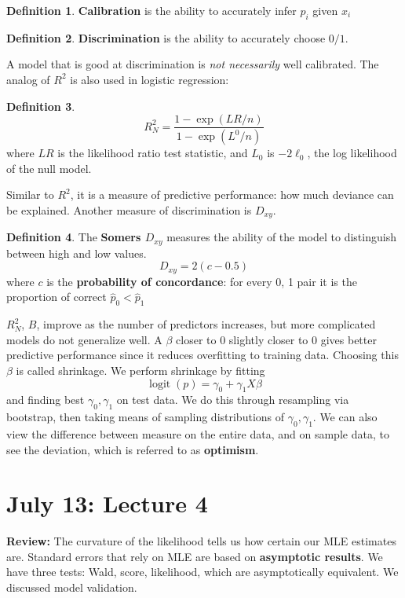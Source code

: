 \documentclass[12pt, a4paper]{article}
\theoremstyle{definition}
\newtheorem{definition}{Definition}
\newcommand{\f}{\frac}
\newcommand{\logit}{\operatorname{logit}}
\begin{document}
	\begin{definition}
		{\bf Calibration} is the ability to accurately infer $p_i$ given $x_i$
	\end{definition}

	\begin{definition}
		{\bf Discrimination} is the ability to accurately choose $0/1$.
	\end{definition}

	A model that is good at discrimination is \textit{not necessarily} well calibrated. The analog of $R^2$ is also used in logistic regression:
	
	\begin{definition}
		$$
			R_N^2 = \f{1 - \exp(LR/n)}{1 - \exp(L^0/n)}
		$$
		where $LR$ is the likelihood ratio test statistic, and $L_0$ is $-2\ell_0$, the log likelihood of the null model.
	\end{definition}
	Similar to $R^2$, it is a measure of predictive performance: how much deviance can be explained. Another measure of discrimination is $D_{xy}$.
	\begin{definition}
		The {\bf Somers $D_{xy}$} measures the ability of the model to distinguish between high and low values. 
		$$D_{xy} = 2(c-0.5)$$
		 where $c$ is the {\bf probability of concordance}: for every 0, 1 pair it is the proportion of correct $\hat p_0 < \hat p_1$
	\end{definition}
	
	$R_N^2$, $B$, improve as the number of predictors increases, but more complicated models do not generalize well. A $\beta$ closer to $0$ slightly closer to $0$ gives better predictive performance since it reduces overfitting to training data. Choosing this $\beta$ is called shrinkage. We perform shrinkage by fitting 
	$$
		\logit(p) = \gamma_0 + \gamma_1 X\beta
	$$
	and finding best $\gamma_0, \gamma_1$ on test data. We do this through resampling via bootstrap, then taking means of sampling distributions of $\gamma_0, \gamma_1$. We can also view the difference between measure on the entire data, and on sample data, to see the deviation, which is referred to as {\bf optimism}.
	
	\section{July 13: Lecture 4}

	
	{\bf Review:} The curvature of the likelihood tells us how certain our MLE estimates are. Standard errors that rely on MLE are based on {\bf asymptotic results}. We have three tests: Wald, score, likelihood, which are asymptotically equivalent. We discussed model validation.
\end{document}

